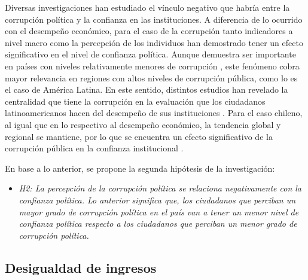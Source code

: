 \documentclass[12pt,twoside]{templates/facsothesis}
\providecommand{\tightlist}{%
  \setlength{\itemsep}{0pt}\setlength{\parskip}{0pt}}
\begin{document}
Diversas investigaciones han estudiado el vínculo negativo que habría entre la corrupción política y la confianza en las instituciones. A diferencia de lo ocurrido con el desempeño económico, para el caso de la corrupción tanto indicadores a nivel macro como la percepción de los individuos han demostrado tener un efecto significativo en el nivel de confianza política. Aunque demuestra ser importante en países con niveles relativamente menores de corrupción \citep{andersonCorruptionPoliticalAllegiances2003, vandermeerPoliticalTrustEvaluation2017, wangGovernmentPerformanceCorruption2016}, este fenómeno cobra mayor relevancia en regiones con altos niveles de corrupción pública, como lo es el caso de América Latina. En este sentido, distintos estudios han revelado la centralidad que tiene la corrupción en la evaluación que los ciudadanos latinoamericanos hacen del desempeño de sus instituciones \citep{boothLegitimacyPuzzleLatin2009, mainwaringStateDeficienciesParty2006, morrisCorruptionTrustTheoretical2010, seligsonImpactCorruptionRegime2002a, stoyanTrustGovernmentInstitutions2016}. Para el caso chileno, al igual que en lo respectivo al desempeño económico, la tendencia global y regional se mantiene, por lo que se encuentra un efecto significativo de la corrupción pública en la confianza institucional \citep{riffoQueInfluyeConfianza2019, saldanazunigaConfianzaInstitucionesPoliticas2019, segoviaMalaiseDemocracyChile2016}.

En base a lo anterior, se propone la segunda hipótesis de la investigación:

\begin{itemize}
\tightlist
\item
  \emph{H2: La percepción de la corrupción política se relaciona negativamente con la confianza política. Lo anterior significa que, los ciudadanos que perciban un mayor grado de corrupción política en el país van a tener un menor nivel de confianza política respecto a los ciudadanos que perciban un menor grado de corrupción política.}
\end{itemize}

\subsection{Desigualdad de ingresos}\label{desigualdad-de-ingresos}
\end{document}

